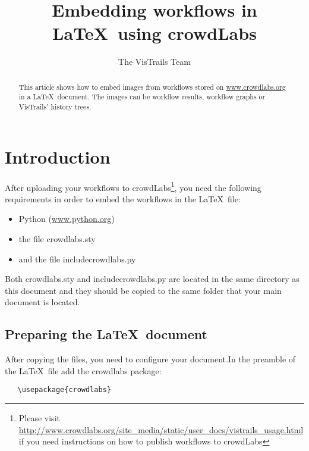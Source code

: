 \documentclass{article}
\title{Embedding workflows in \LaTeX\ using crowdLabs}
\author{The VisTrails Team}
\begin{document}
\maketitle
\begin{abstract}
This article shows how to embed images from workflows stored on
\url{www.crowdlabs.org} in a \LaTeX\ document. The images can be
workflow results, workflow graphs or VisTrails' history trees.
\end{abstract}

\section{Introduction}

After uploading your workflows to crowdLabs\footnote{Please visit
\url{http://www.crowdlabs.org/site_media/static/user_docs/vistrails_usage.html}
if you need instructions on how to publish workflows to crowdLabs}, you need the following requirements in order to embed the workflows in the \LaTeX\ file:
\begin{itemize}
\item Python (\url{www.python.org})
\item the file \textsf{crowdlabs.sty}
\item and the file \textsf{includecrowdlabs.py} 
\end{itemize} 

Both \textsf{crowdlabs.sty} and \textsf{includecrowdlabs.py} are
located in the same directory as this document and they should be
copied to the same folder that your main document is located.

\subsection{Preparing the \LaTeX\ document}

After copying the files, you need to configure your document.In the
preamble of the \LaTeX\ file add the crowdlabs package: 
\begin{verbatim}
   \usepackage{crowdlabs}
\end{verbatim}
\end{document}
